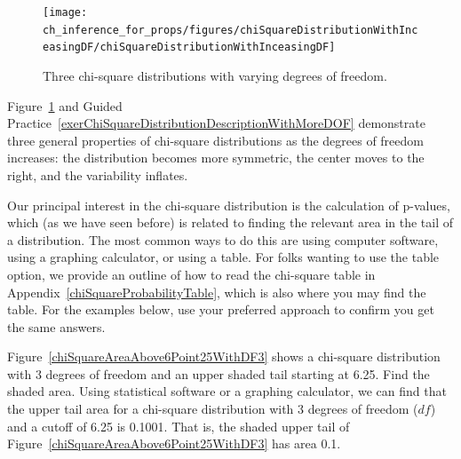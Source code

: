 \begin{figure}[h]
\centering
\texttt{[image: ch\_inference\_for\_props/figures/chiSquareDistributionWithInceasingDF/chiSquareDistributionWithInceasingDF]}
\caption{Three chi-square distributions with varying degrees of freedom.}
\label{chiSquareDistributionWithInceasingDF}
\end{figure}

Figure~\ref{chiSquareDistributionWithInceasingDF} and Guided Practice~\ref{exerChiSquareDistributionDescriptionWithMoreDOF} demonstrate three general properties of chi-square distributions as the degrees of freedom increases: the distribution becomes more symmetric, the center moves to the right, and the variability inflates.

Our principal interest in the chi-square distribution
is the calculation of p-values, which (as we have seen before)
is related to finding the relevant area in the tail of
a distribution.
The most common ways to do this are using computer software,
using a graphing calculator, or using a table.
For folks wanting to use the table option,
we provide an outline of how to read the chi-square table in
Appendix~\ref{chiSquareProbabilityTable},
which is also where you may find the table.
For the examples below, use your preferred approach
to confirm you get the same answers.

\begin{examplewrap}
\begin{nexample}{Figure~\ref{chiSquareAreaAbove6Point25WithDF3}
    shows a chi-square distribution with 3 degrees of freedom
    and an upper shaded tail starting at 6.25.
    Find the shaded area.}
  Using statistical software or a graphing calculator,
  we can find that the upper tail area for a chi-square
  distribution with 3 degrees of freedom ($df$)
  and a cutoff of 6.25 is 0.1001.
  That is, the shaded upper tail of
  Figure~\ref{chiSquareAreaAbove6Point25WithDF3}
  has area 0.1.
\end{nexample}
\end{examplewrap}

